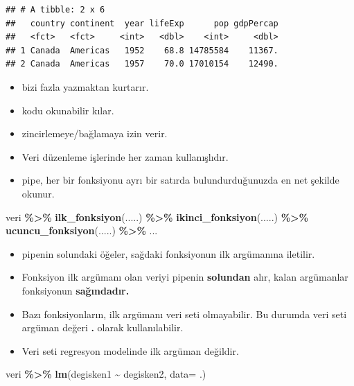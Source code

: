 \documentclass[
  oneside]{book}
\newenvironment{Shaded}{\begin{snugshade}}{\end{snugshade}}
\newcommand{\AttributeTok}[1]{\textcolor[rgb]{0.13,0.29,0.53}{#1}}
\newcommand{\FunctionTok}[1]{\textcolor[rgb]{0.13,0.29,0.53}{\textbf{#1}}}
\newcommand{\NormalTok}[1]{#1}
\newcommand{\SpecialCharTok}[1]{\textcolor[rgb]{0.81,0.36,0.00}{\textbf{#1}}}
\begin{document}
\begin{verbatim}
## # A tibble: 2 x 6
##   country continent  year lifeExp      pop gdpPercap
##   <fct>   <fct>     <int>   <dbl>    <int>     <dbl>
## 1 Canada  Americas   1952    68.8 14785584    11367.
## 2 Canada  Americas   1957    70.0 17010154    12490.
\end{verbatim}

\begin{itemize}
\item
  bizi fazla yazmaktan kurtarır.
\item
  kodu okunabilir kılar.
\item
  zincirlemeye/bağlamaya izin verir.
\item
  Veri düzenleme işlerinde her zaman kullanışlıdır.
\item
  pipe, her bir fonksiyonu ayrı bir satırda bulundurduğunuzda en net şekilde okunur.
\end{itemize}

\begin{Shaded}
\begin{Highlighting}[]
\NormalTok{veri }\SpecialCharTok{\%\textgreater{}\%}
  \FunctionTok{ilk\_fonksiyon}\NormalTok{(.....) }\SpecialCharTok{\%\textgreater{}\%}
  \FunctionTok{ikinci\_fonksiyon}\NormalTok{(.....) }\SpecialCharTok{\%\textgreater{}\%}
  \FunctionTok{ucuncu\_fonksiyon}\NormalTok{(.....) }\SpecialCharTok{\%\textgreater{}\%}\NormalTok{ ...}
\end{Highlighting}
\end{Shaded}

\begin{itemize}
\item
  pipenin solundaki öğeler, sağdaki fonksiyonun ilk argümanına iletilir.
\item
  Fonksiyon ilk argümanı olan veriyi pipenin \textbf{solundan} alır, kalan argümanlar fonksiyonun \textbf{sağındadır.}
\item
  Bazı fonksiyonların, ilk argümanı veri seti olmayabilir. Bu durumda veri seti argüman değeri \textbf{.} olarak kullanılabilir.
\item
  Veri seti regresyon modelinde ilk argüman değildir.
\end{itemize}

\begin{Shaded}
\begin{Highlighting}[]
\NormalTok{veri }\SpecialCharTok{\%\textgreater{}\%} \FunctionTok{lm}\NormalTok{(degisken1 }\SpecialCharTok{\textasciitilde{}}\NormalTok{ degisken2, }\AttributeTok{data=}\NormalTok{ .)}
\end{Highlighting}
\end{Shaded}
\end{document}
